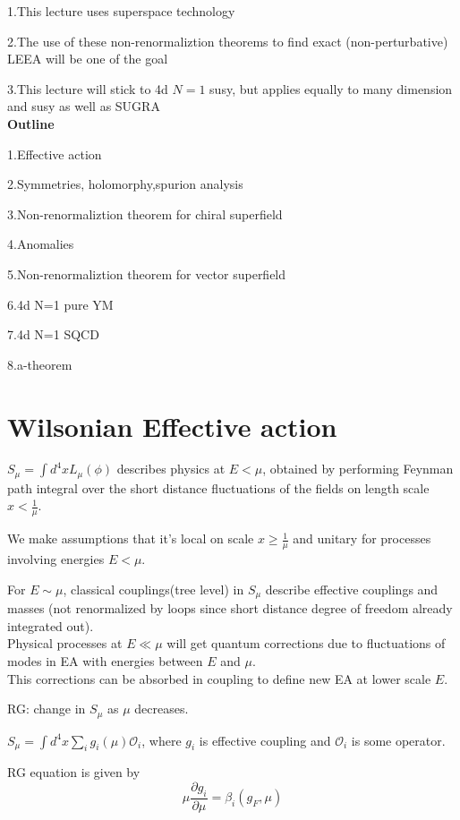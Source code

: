 \documentclass[type = bachelor]{fduthesis-en}
\begin{document}
1.This lecture uses superspace technology

2.The use of these non-renormaliztion theorems to find exact (non-perturbative) LEEA will be one of the goal

3.This lecture will stick to 4d $N=1$ susy, but applies equally to many dimension and susy as well as SUGRA
\bigskip\\
\textbf{Outline}

1.Effective action

2.Symmetries, holomorphy,spurion analysis

3.Non-renormaliztion theorem for chiral superfield

4.Anomalies

5.Non-renormaliztion theorem for vector superfield

6.4d N=1 pure YM

7.4d N=1 SQCD

8.a-theorem
\section{Wilsonian Effective action}
$ S_{\mu} = \int d^{4}x L_{\mu}(\phi)$ describes physics at $E<\mu$, obtained by performing Feynman path integral over the short distance fluctuations of the fields on length scale $x<\frac{1}{\mu}$.

We make assumptions that it's local on scale $x \geq \frac{1}{\mu}$ and unitary for processes involving energies $E < \mu $.

For $E\sim\mu$, classical couplings(tree level) in $S_{\mu}$ describe effective couplings and masses (not renormalized by loops since short distance degree of freedom already integrated out).
\bigskip\\
Physical processes at $E \ll \mu$ will get quantum corrections due to fluctuations of modes in EA with energies between $E$ and $\mu$.
\bigskip\\
This corrections can be absorbed in coupling to define new EA at lower scale $E$.

RG: change in $S_{\mu}$ as $\mu$ decreases.

$S_{\mu} = \int d^{4}x \sum_{i} g_{i}(\mu)\mathcal{O}_{i}$, where $g_{i}$ is effective coupling and $\mathcal{O}_{i}$ is some operator.

RG equation is given by 
\begin{equation}
\label{RGeq}
\mu \frac{\partial g_{i}}{\partial \mu} = \beta_{i}(g_{F},\mu)
\end{equation}
\end{document}
